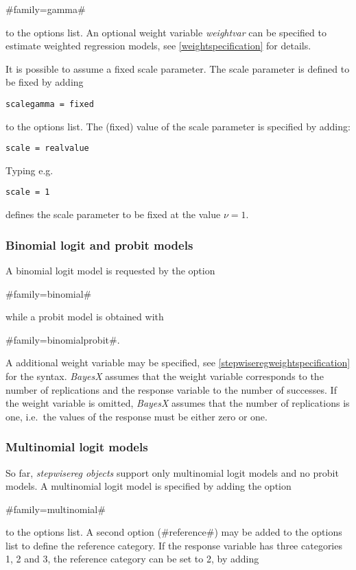 #family=gamma#

to the options list. An optional weight variable {\em weightvar}
can be specified to estimate weighted regression models, see
\autoref{weightspecification} for details.

It is possible to assume a fixed  scale
parameter. The scale parameter is defined to be fixed by adding

{\tt scalegamma = fixed}

to the options list. The (fixed) value of the scale parameter is
specified by adding:

{\tt scale = realvalue}

Typing e.g.

{\tt scale = 1}

defines the scale parameter to be fixed at the value $\nu=1$.


\subsubsection*{Binomial logit and probit models}

A binomial logit model is requested by the option

#family=binomial#

while a probit model is obtained with

#family=binomialprobit#.

A additional weight variable may be specified, see
\autoref{stepwiseregweightspecification} for the syntax. {\em BayesX} assumes
that the weight variable corresponds to the number of replications
and the response variable to the number of successes. If the weight
variable is omitted, {\em BayesX} assumes that the number of
replications is one, i.e.~the values of the response must be either
zero or one.

\subsubsection*{Multinomial logit models}

So far, {\em stepwisereg objects} support only multinomial logit models
and no probit models. A multinomial logit model is specified by adding
the option

#family=multinomial#

to the options list. A second
option (#reference#) may be added to the options list to define the
reference category.  If the response variable has three categories
1, 2 and 3, the reference category can be set to 2, by adding


